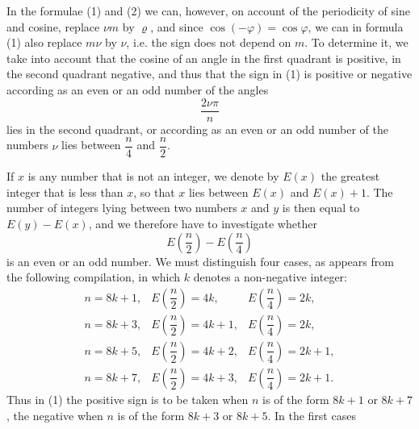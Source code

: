 
In the formulae (1) and (2) we can, however, on account of the periodicity of sine and cosine, replace $\nu m$ by $\varrho$, and since $\cos(-\varphi) = \cos\varphi$, we can in formula (1) also replace $m\nu$ by $\nu$, i.e. the sign does not depend on $m$. To determine it, we take into account that the cosine of an angle in the first quadrant is positive, in the second quadrant negative, and thus that the sign in (1) is positive or negative according as an even or an odd number of the angles
\[
\frac{2\nu\pi}{n}
\]
lies in the second quadrant, or according as an even or an odd number of the numbers $\nu$ lies between $\dfrac{n}{4}$ and $\dfrac{n}{2}$.

If $x$ is any number that is not an integer, we denote by $E(x)$ the greatest integer that is less than $x$, so that $x$ lies between $E(x)$ and $E(x)+1$. The number of integers lying between two numbers $x$ and $y$ is then equal to $E(y) - E(x)$, and we therefore have to investigate whether
\[
E\left(\frac{n}{2}\right) - E\left(\frac{n}{4}\right)
\]
is an even or an odd number. We must distinguish four cases, as appears from the following compilation, in which $k$ denotes a non-negative integer:
\[
\begin{array}{lll}
n = 8k+1, & E\left(\dfrac{n}{2}\right) = 4k, & E\left(\dfrac{n}{4}\right) = 2k, \\[2ex]
n = 8k+3, & E\left(\dfrac{n}{2}\right) = 4k+1, & E\left(\dfrac{n}{4}\right) = 2k, \\[2ex]
n = 8k+5, & E\left(\dfrac{n}{2}\right) = 4k+2, & E\left(\dfrac{n}{4}\right) = 2k+1, \\[2ex]
n = 8k+7, & E\left(\dfrac{n}{2}\right) = 4k+3, & E\left(\dfrac{n}{4}\right) = 2k+1.
\end{array}
\]
Thus in (1) the positive sign is to be taken when $n$ is of the form $8k+1$ or $8k+7$, the negative when $n$ is of the form $8k+3$ or $8k+5$. In the first cases
